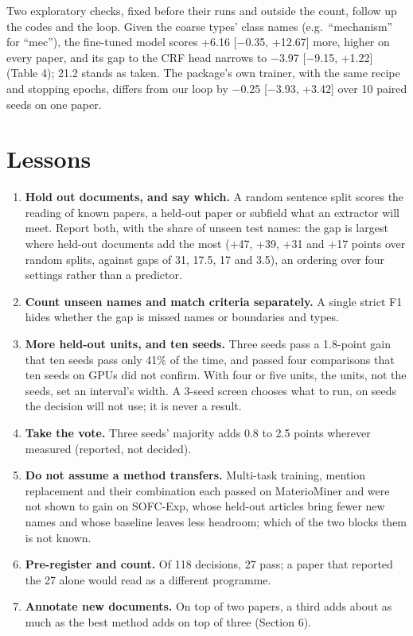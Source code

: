 \documentclass[11pt,a4paper]{article}
\providecommand{\tightlist}{\setlength{\itemsep}{0pt}\setlength{\parskip}{0pt}}
\begin{document}
Two exploratory checks, fixed before their runs and outside the count,
follow up the codes and the loop. Given the coarse types' class names
(e.g.~``mechanism'' for ``mec''), the fine-tuned model scores +6.16 {[}−0.35,
+12.67{]} more, higher on every paper, and its gap to the CRF head narrows
to −3.97 {[}−9.15, +1.22{]} (Table 4); 21.2 stands as taken. The package's own
trainer, with the same recipe and stopping epochs, differs from our loop
by −0.25 {[}−3.93, +3.42{]} over 10 paired seeds on one paper.

\hypertarget{lessons}{%
\section{Lessons}\label{lessons}}

\begin{enumerate}
\def\labelenumi{\arabic{enumi}.}
\tightlist
\item
  \textbf{Hold out documents, and say which.} A random sentence split scores
  the reading of known papers, a held-out paper or subfield what an
  extractor will meet. Report both, with the share of unseen test names:
  the gap is largest where held-out documents add the most (+47, +39, +31
  and +17 points over random splits, against gaps of 31, 17.5, 17 and
  3.5), an ordering over four settings rather than a predictor.
\item
  \textbf{Count unseen names and match criteria separately.} A single strict
  F1 hides whether the gap is missed names or boundaries and types.
\item
  \textbf{More held-out units, and ten seeds.} Three seeds pass a 1.8-point
  gain that ten seeds pass only 41\% of the time, and passed four
  comparisons that ten seeds on GPUs did not confirm. With four or five
  units, the units, not the seeds, set an interval's width. A 3-seed
  screen chooses what to run, on seeds the decision will not use; it is
  never a result.
\item
  \textbf{Take the vote.} Three seeds' majority adds 0.8 to 2.5 points
  wherever measured (reported, not decided).
\item
  \textbf{Do not assume a method transfers.} Multi-task training, mention
  replacement and their combination each passed on MaterioMiner and were
  not shown to gain on SOFC-Exp, whose held-out articles bring fewer new
  names and whose baseline leaves less headroom; which of the two blocks
  them is not known.
\item
  \textbf{Pre-register and count.} Of 118 decisions, 27 pass; a paper that
  reported the 27 alone would read as a different programme.
\item
  \textbf{Annotate new documents.} On top of two papers, a third adds about
  as much as the best method adds on top of three (Section 6).
\end{enumerate}
\end{document}
